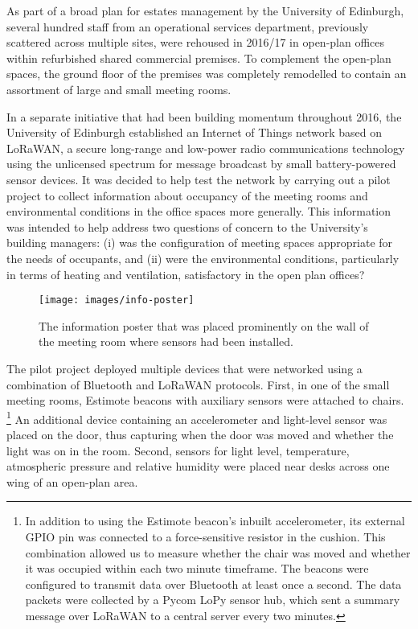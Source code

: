 As part of a broad plan for estates management by the University of
Edinburgh, several hundred staff from an operational
services department, previously scattered across multiple sites, were
rehoused in 2016/17 in open-plan offices within refurbished shared
commercial premises. To complement the open-plan spaces, the ground
floor of the premises was completely remodelled to contain an
assortment of large and small meeting rooms. 

In a separate initiative that had been building momentum throughout
2016, the University of Edinburgh established an Internet of Things
network based on LoRaWAN, a secure long-range and low-power radio
communications technology using the unlicensed spectrum for message
broadcast by small battery-powered sensor devices. It was decided to
help test the network by carrying out a pilot project to collect
information about occupancy of the meeting rooms and environmental
conditions in the office spaces more generally. This information was
intended to help address two questions of concern to the University’s
building managers: (i) was the configuration of meeting spaces
appropriate for the needs of occupants, and (ii) were the
environmental conditions, particularly in terms of heating and
ventilation, satisfactory in the open plan offices? 
\begin{figure}[H]
  \centering
  \texttt{[image: images/info-poster]}
  \caption{The information poster that
    was placed prominently on the wall of the meeting room where
    sensors had been installed.}
  \label{fig:poster}
\end{figure}

The pilot project deployed multiple devices that were networked using
a combination of Bluetooth and LoRaWAN protocols. First, in one of the small
meeting rooms, Estimote beacons with auxiliary sensors were attached
to chairs.%
\footnote{
 In addition to using the Estimote beacon's inbuilt accelerometer, its
 external GPIO pin was connected to a force-sensitive resistor in the
 cushion. This combination allowed us to measure whether the chair was moved and
 whether it was occupied within each two minute timeframe. The
 beacons were configured to transmit data over Bluetooth at least once a
 second. The data packets were collected by
 a Pycom LoPy sensor hub,  which sent a summary message over LoRaWAN to a
 central server every two minutes. } 
An additional device containing an accelerometer and light-level
sensor was placed
on the door, thus capturing
when the door was moved and whether the light was on in the
room. Second, sensors for light level, temperature, atmospheric pressure
and relative humidity were placed near desks across one wing of an
open-plan area.

